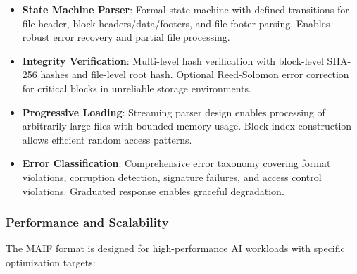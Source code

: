 \documentclass[conference]{IEEEtran}
\begin{document}
\begin{itemize}[leftmargin=*]
\item \textbf{State Machine Parser}: Formal state machine with defined transitions for file header, block headers/data/footers, and file footer parsing. Enables robust error recovery and partial file processing.

\item \textbf{Integrity Verification}: Multi-level hash verification with block-level SHA-256 hashes and file-level root hash. Optional Reed-Solomon error correction for critical blocks in unreliable storage environments.

\item \textbf{Progressive Loading}: Streaming parser design enables processing of arbitrarily large files with bounded memory usage. Block index construction allows efficient random access patterns.

\item \textbf{Error Classification}: Comprehensive error taxonomy covering format violations, corruption detection, signature failures, and access control violations. Graduated response enables graceful degradation.
\end{itemize}

\subsubsection{Performance and Scalability}

The MAIF format is designed for high-performance AI workloads with specific optimization targets:
\end{document}

